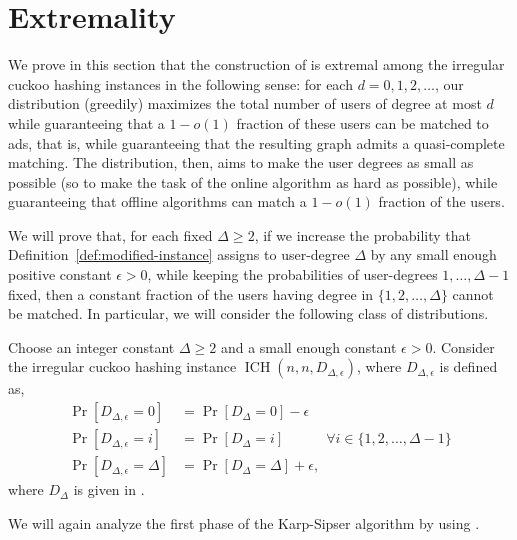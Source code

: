 \documentclass[11pt]{article}
\DeclareMathOperator*{\irregularcuckoohashing}{ICH}
\begin{document}
\section{Extremality}\label{sec:tightness}

We prove in this section that the construction of  is extremal among the irregular cuckoo hashing instances in the following sense: for each $d = 0, 1, 2, \ldots$, our distribution (greedily) maximizes the total number of users of degree at most $d$ while guaranteeing that a $1-o(1)$ fraction of these users can be matched to ads, that is, while guaranteeing that the resulting graph admits a quasi-complete matching. The distribution, then, aims to make the user degrees as small as possible (so to make the task of the  online algorithm as hard  as possible), while guaranteeing that  offline algorithms can match a $1-o(1)$ fraction of the users.

\smallskip

We will prove that, for each fixed $\Delta \ge 2$, if we increase the probability that Definition~\ref{def:modified-instance} assigns to user-degree $\Delta$  by any small enough positive constant $\epsilon > 0$, while keeping the probabilities of user-degrees $1,\ldots,\Delta-1$ fixed, then a constant fraction of the users having degree in $\{1,2,\ldots,\Delta\}$ cannot be matched. In particular, we will consider the following class of distributions.
\begin{definition}\label{def:eps-mass-instance}
Choose an integer constant $\Delta\geq 2$ and a small enough constant $\epsilon>0$. Consider the irregular cuckoo hashing instance $\irregularcuckoohashing(n,n,D_{\Delta,\epsilon})$, where $D_{\Delta,\epsilon}$ is defined as,
\begin{align*}
\Pr[D_{\Delta,\epsilon} = 0] &= \Pr[D_\Delta=0] - \epsilon\\
\Pr[D_{\Delta,\epsilon} = i] &= \Pr[D_\Delta=i] \quad\quad\quad \forall i \in \{1,2,\ldots,\Delta-1\}\\ 
\Pr[D_{\Delta,\epsilon} = \Delta] &= \Pr[D_\Delta=\Delta] + \epsilon,
\end{align*}
where $D_{\Delta}$ is given in .
\end{definition}

We will again analyze the first phase of the Karp-Sipser algorithm by using . 
\end{document}
